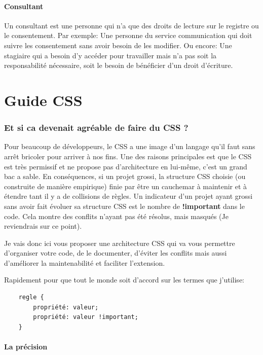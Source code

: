 \documentclass[12pt, a4paper]{report}
\begin{document}
\subsubsection{Consultant}
Un consultant est une personne qui n'a que des droits de lecture sur le registre ou le consentement.\newline
Par exemple: Une personne du service communication qui doit suivre les consentement sans avoir besoin de les modifier.\newline
Ou encore: Une stagiaire qui a besoin d'y accéder pour travailler mais n'a pas soit la responsabilité nécessaire, soit le besoin de bénéficier d'un droit d'écriture.\newline

\chapter{Guide CSS}

\subsection{Et si ca devenait agréable de faire du CSS ?}

Pour beaucoup de développeurs, le CSS a une image d'un langage qu'il faut sans arrêt bricoler pour arriver à nos fins.
Une des raisons principales est que le CSS est très permissif et ne propose pas d'architecture en lui-même, c'est un grand bac a sable.
En conséquences, si un projet grossi, la structure CSS choisie (ou construite de manière empirique) finie par être un cauchemar à maintenir et à étendre tant il y a de collisions de règles.
Un indicateur d'un projet ayant grossi sans avoir fait évoluer sa structure CSS est le nombre de \textbf{!important} dans le code. Cela montre des conflits n'ayant pas été résolus, mais masqués (Je reviendrais sur ce point).

Je vais donc ici vous proposer une architecture CSS qui va vous permettre d'organiser votre code, de le documenter, d'éviter les conflits mais aussi d'améliorer la maintenabilité et faciliter l'extension.

Rapidement pour que tout le monde soit d'accord sur les termes que j'utilise:
\begin{lstlisting}
    regle {
        propriété: valeur;
        propriété: valeur !important;
    }
\end{lstlisting}

\subsubsection{La précision}
\end{document}
